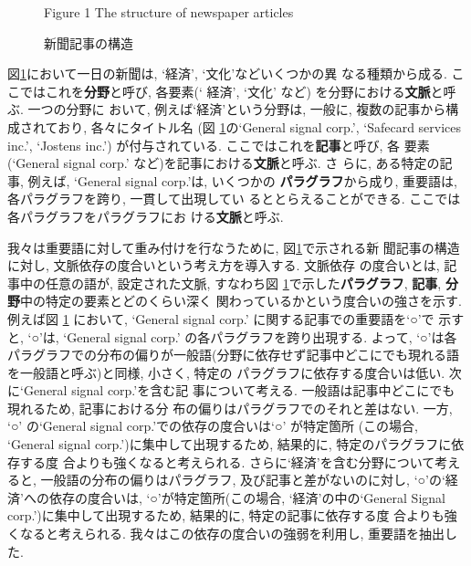 {
\begin{figure}[htbp]
\centerline{
}
\caption{新聞記事の構造} \label{depend}
\begin{center}
\vspace*{-5mm}
Figure 1 The structure of newspaper articles \end{center}
\vspace*{-2mm}
\end{figure}
}

\noindent
図\ref{depend}において一日の新聞は, `経済', `文化'などいくつかの異
なる種類から成る.  ここではこれを{\bf 分野}と呼び, 各要素(`
経済', `文化' など) を分野における{\bf 文脈}と呼ぶ.  一つの分野に
おいて, 例えば`経済'という分野は, 一般に, 複数の記事から構成されており, 
各々にタイトル名 (図
\ref{depend}の`General signal corp.', `Safecard services inc.',
`Jostens inc.') が付与されている.  ここではこれを{\bf 記事}と呼び, 各
要素 (`General signal corp.' など)を記事における{\bf 文脈}と呼ぶ.  さ
らに, ある特定の記事, 例えば, `General signal corp.'は, いくつかの{\bf 
パラグラフ}から成り, 重要語は, 各パラグラフを跨り, 一貫して出現してい
るととらえることができる.  ここでは各パラグラフをパラグラフにお
ける{\bf 文脈}と呼ぶ.


我々は重要語に対して重み付けを行なうために, 図\ref{depend}で示される新
聞記事の構造に対し, 文脈依存の度合いという考え方を導入する.  文脈依存
の度合いとは, 記事中の任意の語が, 設定された文脈, すなわち図
\ref{depend}で示した{\bf パラグラフ}, {\bf 記事}, {\bf 分野}中の特定の要素とどのくらい深く
関わっているかという度合いの強さを示す.  例えば図
\ref{depend} において, `General signal corp.' に関する記事での重要語を`○'で
示すと, `○'は, `General signal corp.' の各パラグラフを跨り出現する.
よって, `○'は各パラグラフでの分布の偏りが一般語(分野に依存せず記事中どこにでも現れる語を一般語と呼ぶ)と同様, 小さく, 特定の
パラグラフに依存する度合いは低い.  次に`General signal corp.'を含む記
事について考える.  一般語は記事中どこにでも現れるため, 記事における分
布の偏りはパラグラフでのそれと差はない.  一方, `○' の`General signal
corp.'での依存の度合いは`○' が特定箇所 (この場合, `General signal
corp.')に集中して出現するため, 結果的に, 特定のパラグラフに依存する度
合よりも強くなると考えられる.  さらに`経済'を含む分野について考えると, 
一般語の分布の偏りはパラグラフ, 及び記事と差がないのに対し, `○'の`経
済'への依存の度合いは, `○'が特定箇所(この場合, `経済'の中の`General
Signal corp.')に集中して出現するため, 結果的に, 特定の記事に依存する度
合よりも強くなると考えられる.  我々はこの依存の度合いの強弱を利用し, 
重要語を抽出した.

